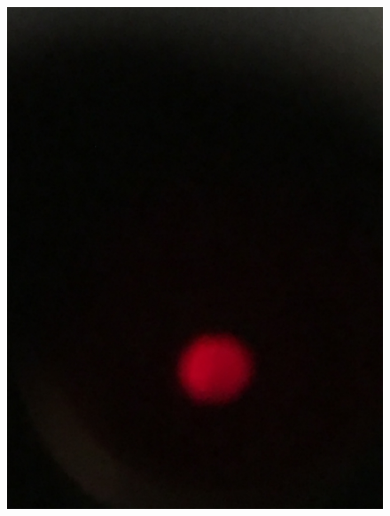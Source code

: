 \begin{figure}[h!]
\begin{minipage}{0.3\linewidth}
		\includegraphics[width=\linewidth]{biquarz/red2.jpg}
	\end{minipage}
	\begin{minipage}{0.3\linewidth}

\end{minipage}
\end{figure}
